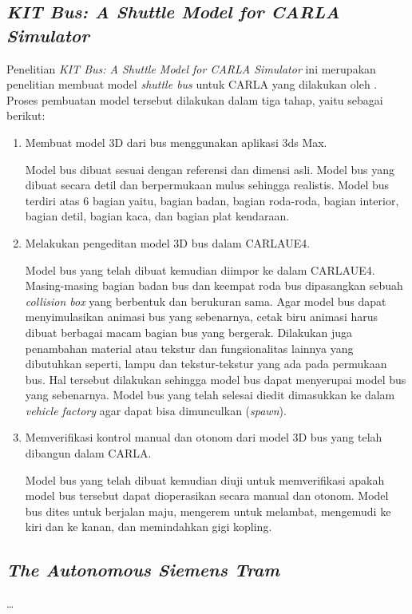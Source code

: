\subsection{\textit{KIT Bus: A Shuttle Model for CARLA Simulator}}
Penelitian \textit{KIT Bus: A Shuttle Model for CARLA Simulator} ini merupakan
penelitian membuat model \textit{shuttle bus} untuk CARLA yang dilakukan oleh
\cite{related-work-xiang}. Proses pembuatan model tersebut dilakukan dalam tiga
tahap, yaitu sebagai berikut:
\begin{enumerate}
    \item Membuat model 3D dari bus menggunakan aplikasi 3ds Max.

    Model bus dibuat sesuai dengan referensi dan dimensi asli. Model bus yang
    dibuat secara detil dan berpermukaan mulus sehingga realistis. Model bus
    terdiri atas 6 bagian yaitu, bagian badan, bagian roda-roda, bagian
    interior, bagian detil, bagian kaca, dan bagian plat kendaraan.

    \item Melakukan pengeditan model 3D bus dalam CARLAUE4.

    Model bus yang telah dibuat kemudian diimpor ke dalam CARLAUE4.
    Masing-masing bagian badan bus dan keempat roda bus dipasangkan sebuah
    \textit{collision box} yang berbentuk dan berukuran sama. Agar model bus
    dapat menyimulasikan animasi bus yang sebenarnya, cetak biru animasi harus
    dibuat berbagai macam bagian bus yang bergerak. Dilakukan juga penambahan
    material atau tekstur dan fungsionalitas lainnya yang dibutuhkan seperti,
    lampu dan tekstur-tekstur yang ada pada permukaan bus. Hal tersebut
    dilakukan sehingga model bus dapat menyerupai model bus yang sebenarnya.
    Model bus yang telah selesai diedit dimasukkan ke dalam \textit{vehicle
    factory} agar dapat bisa dimunculkan (\textit{spawn}).

    \item Memverifikasi kontrol manual dan otonom dari model 3D bus yang telah
    dibangun dalam CARLA.

    Model bus yang telah dibuat kemudian diuji untuk memverifikasi apakah model
    bus tersebut dapat dioperasikan secara manual dan otonom. Model bus dites
    untuk berjalan maju, mengerem untuk melambat, mengemudi ke kiri dan ke
    kanan, dan memindahkan gigi kopling.

\end{enumerate}

\subsection{\textit{The Autonomous Siemens Tram}}
\dots

